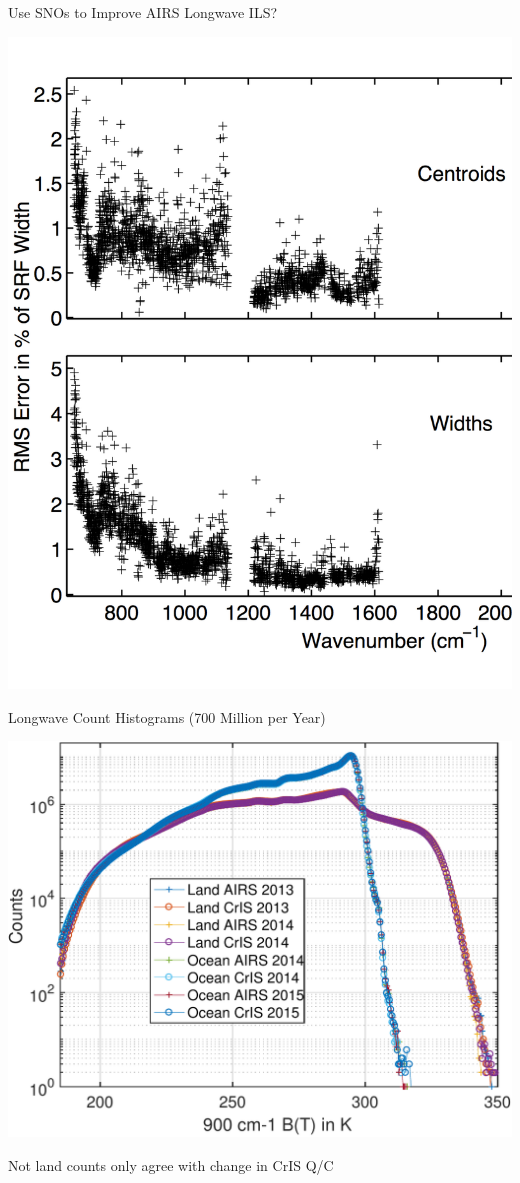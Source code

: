 \documentclass[10pt,t]{beamer}
\begin{document}
\begin{frame}[label={sec:orgdf19c22}]{Use SNOs to Improve AIRS Longwave ILS?}
\vspace{-0.15in}
\begin{center}
\includegraphics[width=0.6\linewidth]{./center-width-rms-err.png}
\end{center}
\end{frame}

\begin{frame}[label={sec:org69bb52a}]{Longwave Count Histograms (700 Million per Year)}
\begin{center}
\includegraphics[width=0.7\linewidth]{./Figs/Pdf/land_and_ocean_allT.pdf}
\end{center}
\vspace{-0.15in}
\small
Not land counts only agree with change in CrIS Q/C
\end{frame}
\end{document}

